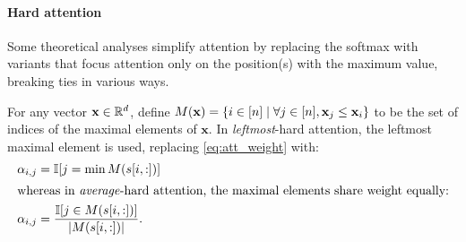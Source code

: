 \paragraph{Hard attention}
Some theoretical analyses simplify attention by replacing the softmax with variants that focus attention only on the position(s) with the maximum value, breaking ties in various ways.

For any vector $\mathbf{x} \in \mathbb{R}^d$, define $M(\mathbf{x}) = \{i \in [n] \mid \forall j \in [n], \mathbf{x}_{j} \le \mathbf{x}_{i}\}$ to be the set of indices of the maximal elements of $\mathbf{x}$.
In \emph{leftmost}-hard attention, the leftmost maximal element is used, replacing \cref{eq:att_weight} with:
\begin{align}
    \alpha_{i,j} &= \mathbb{I}[j = \min M(s[i,:])] \\
\intertext{whereas in \emph{average}-hard attention, the maximal elements share weight equally:}
    \alpha_{i,j} &= \frac{\mathbb{I}[j \in M(s[i,:])]}{|M(s[i,:])|}.
\end{align}

